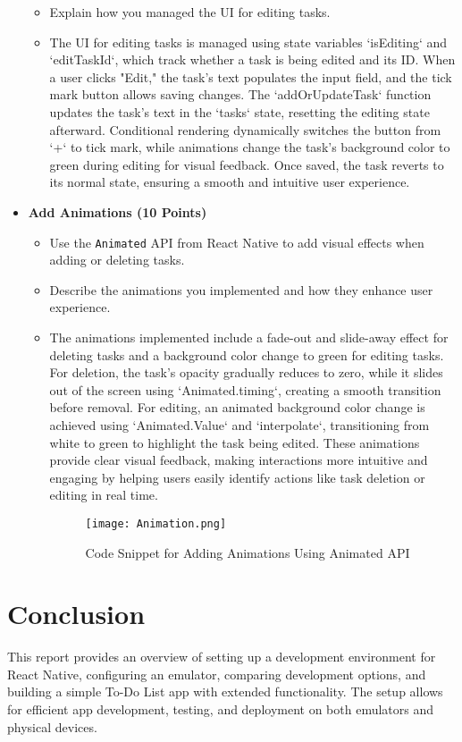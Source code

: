 \documentclass{article}
\begin{document}
\begin{itemize}
\begin{itemize}
        \item Explain how you managed the UI for editing tasks.
        \item The UI for editing tasks is managed using state variables `isEditing` and `editTaskId`, which track whether a task is being edited and its ID. When a user clicks "Edit," the task's text populates the input field, and the tick mark button allows saving changes. The `addOrUpdateTask` function updates the task's text in the `tasks` state, resetting the editing state afterward. Conditional rendering dynamically switches the button from `+` to tick mark, while animations change the task's background color to green during editing for visual feedback. Once saved, the task reverts to its normal state, ensuring a smooth and intuitive user experience.
    \end{itemize}
    
    \item \textbf{Add Animations (10 Points)}
    \begin{itemize}
        \item Use the \texttt{Animated} API from React Native to add visual effects when adding or deleting tasks.
        \item Describe the animations you implemented and how they enhance user experience.
             \item The animations implemented include a fade-out and slide-away effect for deleting tasks and a background color change to green for editing tasks. For deletion, the task's opacity gradually reduces to zero, while it slides out of the screen using `Animated.timing`, creating a smooth transition before removal. For editing, an animated background color change is achieved using `Animated.Value` and `interpolate`, transitioning from white to green to highlight the task being edited. These animations provide clear visual feedback, making interactions more intuitive and engaging by helping users easily identify actions like task deletion or editing in real time.
        \begin{figure}[H]
            \centering
            \texttt{[image: Animation.png]}
            \caption{Code Snippet for Adding Animations Using Animated API}
        \end{figure}
    \end{itemize}
\end{itemize}

\section{Conclusion}
This report provides an overview of setting up a development environment for React Native, configuring an emulator, comparing development options, and building a simple To-Do List app with extended functionality. The setup allows for efficient app development, testing, and deployment on both emulators and physical devices.
\end{document}
